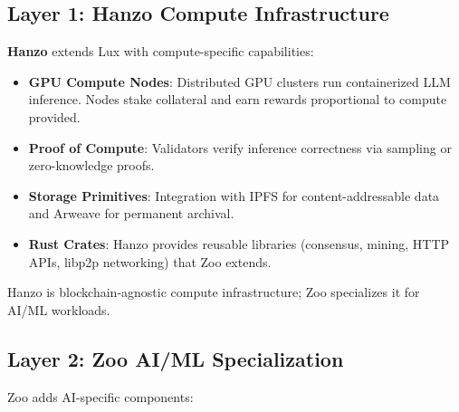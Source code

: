 \documentclass[11pt,a4paper]{article}
\begin{document}
\subsection{Layer 1: Hanzo Compute Infrastructure}

\textbf{Hanzo} \cite{hanzo2025paper} extends Lux with compute-specific capabilities:

\begin{itemize}[leftmargin=*]
\item \textbf{GPU Compute Nodes}: Distributed GPU clusters run containerized LLM inference. Nodes stake collateral and earn rewards proportional to compute provided.
\item \textbf{Proof of Compute}: Validators verify inference correctness via sampling or zero-knowledge proofs.
\item \textbf{Storage Primitives}: Integration with IPFS for content-addressable data and Arweave for permanent archival.
\item \textbf{Rust Crates}: Hanzo provides reusable libraries (consensus, mining, HTTP APIs, libp2p networking) that Zoo extends.
\end{itemize}

Hanzo is blockchain-agnostic compute infrastructure; Zoo specializes it for AI/ML workloads.

\subsection{Layer 2: Zoo AI/ML Specialization}

Zoo adds AI-specific components:
\end{document}
